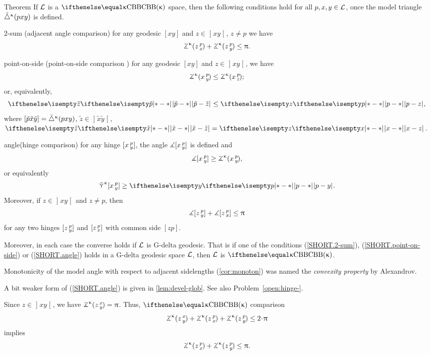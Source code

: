 \begin{thm}{Theorem}
\label{thm:defs_of_alex} 
If $\mathcal{L}$ is a $\Alex\kappa$ space, 
then the following conditions hold for all $p,x,y\in \spc{L}$, once the model triangle ${\tilde\triangle}^{\upkappa}(p x y)$ is defined.

\begin{subthm}{2-sum} 
(adjacent angle comparison) for any geodesic $[x y]$ and $z\in \mathopen{]}x y\mathclose{[}$, $z\not=p$ we have
\[\angk\kappa z p x
+\angk\kappa z p y\le \pi.\]
\end{subthm}

\begin{subthm}{point-on-side}
(point-on-side comparison%
)
for any geodesic $[x y]$ and $z\in \mathopen{]}x y\mathclose{[}$, we have
\[\angk\kappa x p y\le\angk\kappa x p z;\]
or, equivalently, 
\[\dist{\tilde p}{\tilde z}{}\le \dist{p}{z}{},\]
where $[{\tilde p}{\tilde x}{\tilde y}]={\tilde\triangle}^{\upkappa}(p x y)$, $\tilde z\in\mathopen{]} \tilde x\tilde y\mathclose{[}$, $\dist{\tilde x}{\tilde z}{}=\dist{x}{z}{}$.
\end{subthm}

\begin{subthm}{angle}(hinge comparison)
for any hinge $[x\,{}^{p}_{y}]$, the angle 
$\measuredangle[x\,{}^{p}_{y}]$ is defined and 
\[\mangle\hinge x p y\ge\angk\kappa x p y,\]
or equivalently
\[\side\kappa \hinge x p y\ge\dist{p}{y}{}.\]
Moreover, if $z\in\mathopen{]}x y\mathclose{[}$ and $z\not=p$, then 
\[\mangle\hinge z p y + \mangle\hinge z p x\le\pi\]
for any two hinges $[z\,{}^{p}_{y}]$ and $[z\,{}^{p}_{x}]$ with common side $[z p]$.
\end{subthm}

Moreover, in each case the converse holds if $\mathcal{L}$ is G-delta geodesic.
That is if one of the conditions (\ref{SHORT.2-sum}), (\ref{SHORT.point-on-side}) or  (\ref{SHORT.angle}) holds in a  G-delta geodesic space $\mathcal{L}$, then $\mathcal{L}$ is $\Alex\kappa$.
\end{thm}

Monotonicity of the model angle with respect to adjacent sidelengths (\ref{cor:monoton}) was named the \emph{convexity property} by Alexandrov.

A bit weaker form of (\ref{SHORT.angle}) 
is given in \ref{lem:devel-glob}.
See also Problem~\ref{open:hinge-}.


 Since $z\in \mathopen{]}x y\mathclose{[}$, we have $\angk\kappa z x y=\pi$. 
Thus, $\Alex\kappa$ comparison
\[\angk\kappa z x y
+\angk\kappa z p x
+\angk\kappa z p y\le2\cdot\pi\]
implies
\[\angk\kappa z p x
+\angk\kappa z p y
\le\pi.\]

